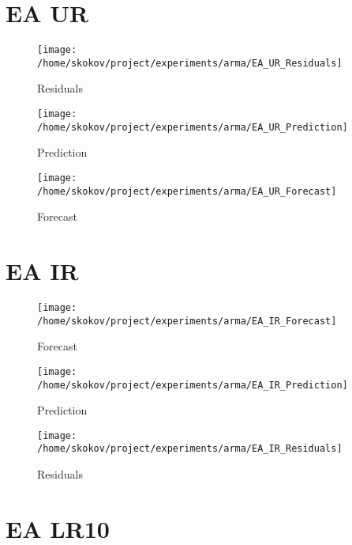 %
\section{EA UR}%


\begin{figure}[h!]%
\centering%
\texttt{[image: /home/skokov/project/experiments/arma/EA\_UR\_Residuals]}%
\caption{Residuals}%
\label{fig:EA_UR_Residuals}%
\end{figure}

%


\begin{figure}[h!]%
\centering%
\texttt{[image: /home/skokov/project/experiments/arma/EA\_UR\_Prediction]}%
\caption{Prediction}%
\label{fig:EA_UR_Prediction}%
\end{figure}

%


\begin{figure}[h!]%
\centering%
\texttt{[image: /home/skokov/project/experiments/arma/EA\_UR\_Forecast]}%
\caption{Forecast}%
\label{fig:EA_UR_Forecast}%
\end{figure}

%
\section{EA IR}%


\begin{figure}[h!]%
\centering%
\texttt{[image: /home/skokov/project/experiments/arma/EA\_IR\_Forecast]}%
\caption{Forecast}%
\label{fig:EA_IR_Forecast}%
\end{figure}

%


\begin{figure}[h!]%
\centering%
\texttt{[image: /home/skokov/project/experiments/arma/EA\_IR\_Prediction]}%
\caption{Prediction}%
\label{fig:EA_IR_Prediction}%
\end{figure}

%


\begin{figure}[h!]%
\centering%
\texttt{[image: /home/skokov/project/experiments/arma/EA\_IR\_Residuals]}%
\caption{Residuals}%
\label{fig:EA_IR_Residuals}%
\end{figure}

%
\section{EA LR10}%


